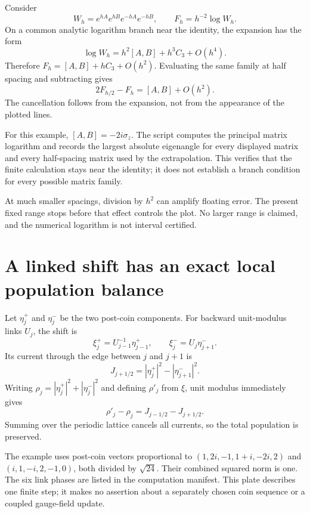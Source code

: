 Consider
\[
W_h=e^{hA}e^{hB}e^{-hA}e^{-hB},\qquad
F_h=h^{-2}\log W_h.
\]
On a common analytic logarithm branch near the identity, the expansion has the form
\[
\log W_h=h^2[A,B]+h^3C_3+O(h^4).
\]
Therefore $F_h=[A,B]+hC_3+O(h^2)$. Evaluating the same family at half spacing and subtracting gives
\[
2F_{h/2}-F_h=[A,B]+O(h^2).
\]
The cancellation follows from the expansion, not from the appearance of the plotted lines.

For this example, $[A,B]=-2i\sigma_z$. The script computes the principal matrix logarithm and records the largest absolute eigenangle for every displayed matrix and every half-spacing matrix used by the extrapolation. This verifies that the finite calculation stays near the identity; it does not establish a branch condition for every possible matrix family.

At much smaller spacings, division by $h^2$ can amplify floating error. The present fixed range stops before that effect controls the plot. No larger range is claimed, and the numerical logarithm is not interval certified.



\clearpage
\section{A linked shift has an exact local population balance}

Let $\eta_j^+$ and $\eta_j^-$ be the two post-coin components. For backward unit-modulus links $U_j$, the shift is
\[
\xi_j^+=U_{j-1}^{-1}\eta_{j-1}^+,
\qquad \xi_j^-=U_j\eta_{j+1}^-.
\]
Its current through the edge between $j$ and $j+1$ is
\[
J_{j+1/2}=|\eta_j^+|^2-|\eta_{j+1}^-|^2.
\]
Writing $\rho_j=|\eta_j^+|^2+|\eta_j^-|^2$ and defining $\rho'_j$ from $\xi$, unit modulus immediately gives
\[
\rho'_j-\rho_j=J_{j-1/2}-J_{j+1/2}.
\]
Summing over the periodic lattice cancels all currents, so the total population is preserved.

The example uses post-coin vectors proportional to $(1,2i,-1,1+i,-2i,2)$ and $(i,1,-i,2,-1,0)$, both divided by $\sqrt{24}$. Their combined squared norm is one. The six link phases are listed in the computation manifest. This plate describes one finite step; it makes no assertion about a separately chosen coin sequence or a coupled gauge-field update.

